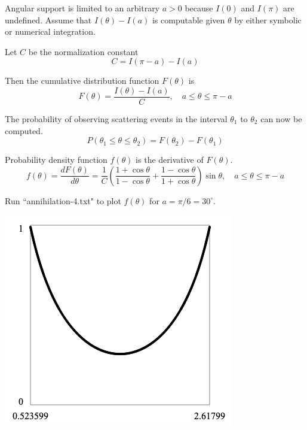 \documentclass[12pt]{article}
\begin{document}
\noindent
Angular support is limited to an arbitrary $a>0$
because $I(0)$ and $I(\pi)$ are undefined.
Assume that $I(\theta)-I(a)$ is computable given $\theta$ by either symbolic
or numerical integration.

\bigskip
\noindent
Let $C$ be the normalization constant
\begin{equation*}
C=I(\pi-a)-I(a)
\end{equation*}

\noindent
Then the cumulative distribution function $F(\theta)$ is
\begin{equation*}
F(\theta)=\frac{I(\theta)-I(a)}{C},
\quad a\le\theta\le\pi-a
\end{equation*}

\noindent
The probability of observing scattering events in the interval
$\theta_1$ to $\theta_2$ can now be computed.
\begin{equation*}
P(\theta_1\le\theta\le\theta_2)=F(\theta_2)-F(\theta_1)
\end{equation*}

\noindent
Probability density function $f(\theta)$ is the derivative of $F(\theta)$.
\begin{equation*}
f(\theta)=\frac{dF(\theta)}{d\theta}=\frac{1}{C}
\left(
\frac{1+\cos\theta}{1-\cos\theta}+
\frac{1-\cos\theta}{1+\cos\theta}
\right)\sin\theta,
\quad a\le\theta\le\pi-a
\end{equation*}

\noindent
Run ``annihilation-4.txt" to plot $f(\theta)$ for $a=\pi/6=30^\circ$.

\begin{center}
\includegraphics[scale=0.5]{annihilation.png}
\end{center}
\end{document}
